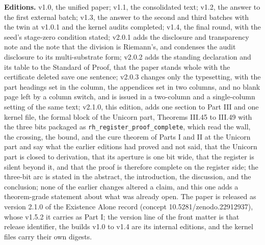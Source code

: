 \documentclass[10pt]{article}
\begin{document}
\textbf{Editions.} v1.0, the unified paper; v1.1, the consolidated text;
v1.2, the answer to the first external batch; v1.3, the answer to the
second and third batches with the twin at v1.0.1 and the kernel audits
completed; v1.4, the final round, with the seed's stage-zero condition
stated; v2.0.1 adds the disclosure and transparency note and the note
that the division is Riemann's, and condenses the audit disclosure to
its multi-substrate form; v2.0.2 adds the standing declaration and its
table to the Standard of Proof, that the paper stands whole with the
certificate deleted save one sentence; v2.0.3 changes only the
typesetting, with the part headings set in the column, the appendices
set in two columns, and no blank page left by a column switch, and is
issued in a two-column and a single-column setting of the same text;
v2.1.0, this edition, adds one section to Part III and one kernel file,
the formal block of the Unicorn part, Theorems III.45 to III.49 with the
three bits packaged as \texttt{rh\_register\_proof\_complete}, which
read the wall, the crossing, the bound, and the cure theorem of Parts I
and II at the Unicorn part and say what the earlier editions had proved
and not said, that the Unicorn part is closed to derivation, that its
aperture is one bit wide, that the register is silent beyond it, and
that the proof is therefore complete on the register side; the three-bit
arc is stated in the abstract, the introduction, the discussion, and the
conclusion; none of the earlier changes altered a claim, and this one
adds a theorem-grade statement about what was already open. The paper is
released as version 2.1.0 of the Existence Alone record (concept
10.5281/zenodo.22912937), whose v1.5.2 it carries as Part I; the version
line of the front matter is that release identifier, the builds v1.0 to
v1.4 are its internal editions, and the kernel files carry their own
digests.
\end{document}

